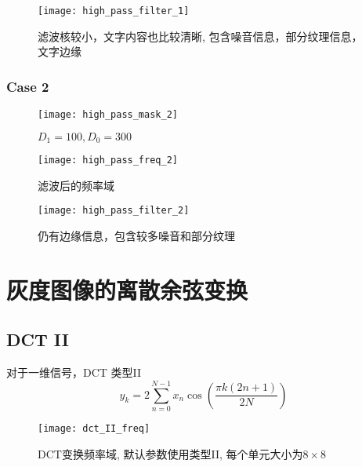 \documentclass{myreport}
\begin{document}
    \begin{figure}[H]
      \centering
      \texttt{[image: high\_pass\_filter\_1]}
      \caption{%
        滤波核较小，文字内容也比较清晰,%
        包含噪音信息，部分纹理信息，文字边缘%
      }
      \label{fig:high_pass_filter_1}
    \end{figure}
    \subsubsection{Case 2}
        \begin{figure}[H]
          \centering
          \texttt{[image: high\_pass\_mask\_2]}
          \caption{$D_1 = 100, D_0 = 300$}
          \label{fig:ow_pass_mask_2}
        \end{figure}

        \begin{figure}[H]
          \centering
          \texttt{[image: high\_pass\_freq\_2]}
          \caption{滤波后的频率域}
          \label{fig:low_pass_freq_2}
        \end{figure}
        \begin{figure}[H]
          \centering
          \texttt{[image: high\_pass\_filter\_2]}
          \caption{仍有边缘信息，包含较多噪音和部分纹理}
          \label{fig:low_pass_filter_2}
        \end{figure}
\section{灰度图像的离散余弦变换}
  \subsection{DCT II}
    对于一维信号，DCT 类型II
    \begin{equation}
      y_k = 2 \sum_{n=0}^{N-1} 
        x_n \cos\left(
          \frac{\pi k(2n+1)}{2N} 
        \right)
    \end{equation}
    \begin{figure}[H]
      \centering
      \texttt{[image: dct\_II\_freq]}
      \caption{%
        DCT变换频率域,%
        默认参数使用类型II,%
        每个单元大小为$8 \times 8$%
      }
      \label{fig:dct_II_freq}
    \end{figure}
\end{document}
